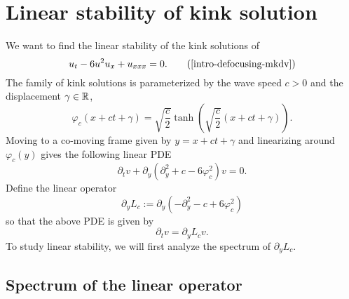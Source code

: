 \section{Linear stability of kink solution}

We want to find the linear stability of the kink solutions of 
\begin{equation*}
	u_t - 6u^2u_x + u_{xxx} = 0. \tag{\ref{intro-defocusing-mkdv}}
\end{equation*}
The family of kink solutions is parameterized by the wave speed \(c>0\) and the displacement \(\gamma \in \mathbb{R}\),
\begin{equation}
	\varphi_c(x + ct + \gamma)  = \sqrt{\frac c 2} \tanh\left(\sqrt{\frac c 2} (x +ct + \gamma) \right).
\end{equation}
Moving to a co-moving frame given by \(y = x+ct+\gamma\) and linearizing around \(\varphi_c(y)\) gives the following linear PDE
\begin{equation}
	\partial_t v + \partial_y (\partial_y^2 + c - 6 \varphi_c^2)v = 0.
\end{equation}
Define the linear operator
\begin{equation}
	\partial_y L_c := \partial_y(-\partial_y^2 - c + 6 \varphi_c^2)
\end{equation}
so that the above PDE is given by 
\begin{equation}\label{linear-v-eqn}
	\partial_t v = \partial_y L_c v.
\end{equation}
To study linear stability, we will first analyze the spectrum of \(\partial_y L_c\).

\subsection{Spectrum of the linear operator}

